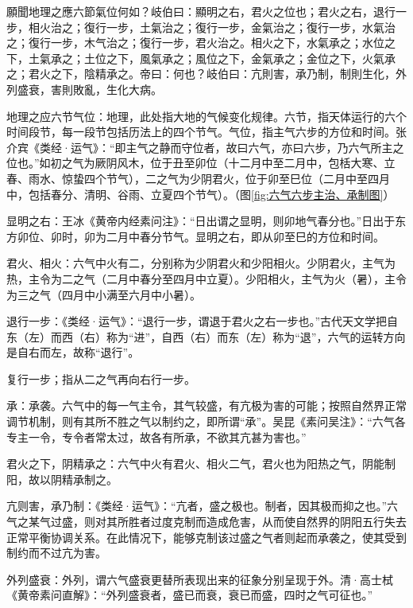 \documentclass[12pt]{ctexbook}
\begin{document}

\begin{yuanwen}
願聞地理之應六節氣位何如？岐伯曰：顯明之右，君火之位也；君火之右，退行一步，相火治之；復行一步，土氣治之；復行一步，金氣治之；復行一步，水氣治之；復行一步，木气治之；復行一步，君火治之。相火之下，水氣承之；水位之下，土氣承之；土位之下，風氣承之；風位之下，金氣承之；金位之下，火氣承之；君火之下，陰精承之。帝曰：何也？岐伯曰：亢則害，承乃制，制則生化，外列盛衰，害則敗亂，生化大病。
\end{yuanwen}


\begin{jiaozhu}
	\item 地理之应六节气位：地理，此处指大地的气候变化规律。六节，指天体运行的六个时间段节，每一段节包括历法上的四个节气。气位，指主气六步的方位和时间。张介宾《类经·运气》：“即主气之静而守位者，故曰六气，亦曰六步，乃六气所主之位也。”如初之气为厥阴风木，位于丑至卯位（十二月中至二月中，包栝大寒、立春、雨水、惊蛰四个节气），二之气为少阴君火，位于卯至巳位（二月中至四月中，包括春分、清明、谷雨、立夏四个节气）。（图\ref{fig:六气六步主治、承制图}）
	\item 显明之右：王冰《黄帝内经素问注》：“日出谓之显明，则卯地气春分也。”日出于东方卯位、卯时，卯为二月中春分节气。显明之右，即从卯至巳的方位和时间。
	\item 君火、相火：六气中火有二，分别称为少阴君火和少阳相火。少阴君火，主气为热，主令为二之气（二月中春分至四月中立夏）。少阳相火，主气为火（暑），主令为三之气（四月中小满至六月中小暑）。
	\item 退行一步：《类经·运气》：“退行一步，谓退于君火之右一步也。”古代天文学把自东（左）而西（右）称为“进”，自西（右）而东（左）称为“退”，六气的运转方向是自右而左，故称“退行”。
	\item 复行一步；指从二之气再向右行一步。
	\item 承：承袭。六气中的每一气主令，其气较盛，有亢极为害的可能；按照自然界正常调节机制，则有其所不胜之气以制约之，即所谓“承”。吴昆《素问吴注》：“六气各专主一令，专令者常太过，故各有所承，不欲其亢甚为害也。”
	\item 君火之下，阴精承之：六气中火有君火、相火二气，君火也为阳热之气，阴能制阳，故以阴精承制之。
	\item 亢则害，承乃制：《类经·运气》：“亢者，盛之极也。制者，因其极而抑之也。”六气之某气过盛，则对其所胜者过度克制而造成危害，从而使自然界的阴阳五行失去正常平衡协调关系。在此情况下，能够克制该过盛之气者则起而承袭之，使其受到制约而不过亢为害。
	\item 外列盛衰：外列，谓六气盛衰更替所表现出来的征象分别呈现于外。清·高士栻《黄帝素问直解》：“外列盛衰者，盛已而衰，衰已而盛，四时之气可征也。”
\end{jiaozhu}
\end{document}
